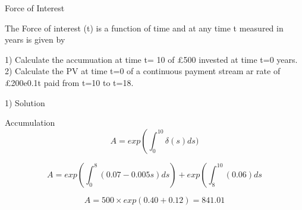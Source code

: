 Force of Interest

The Force of interest (t) is a function of time and at any time t measured in years is given by
 


1) Calculate the accumuation at time t= 10 of £500 invested at time t=0 years.
2) Calculate the PV at time t=0 of a continuous payment stream ar rate of £200e0.1t paid from t=10 to t=18.
 
1) Solution
 
Accumulation \[A = exp \left( \int_0^{10} \delta(s) ds )\]
 
\[A = exp \left( \int_0^8 (0.07-0.005s) ds \right) + exp \left(\int_8^{10}(0.06) ds
\] 

\[A = 500 \times exp(0.40 + 0.12) = 841.01
 \]

